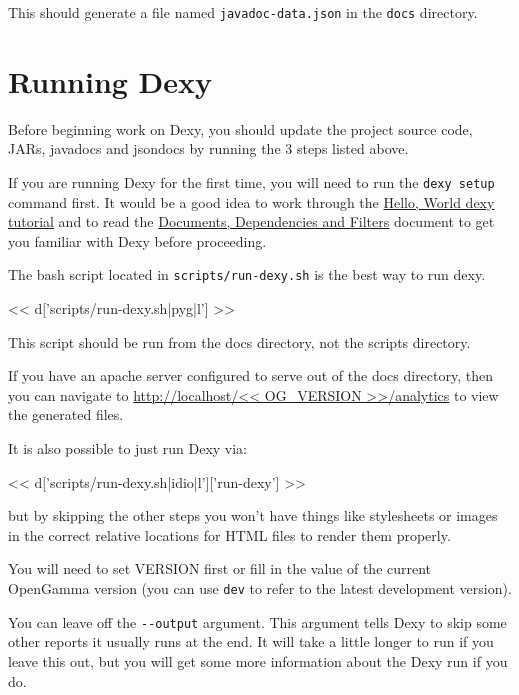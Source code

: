 This should generate a file named \verb|javadoc-data.json| in the
\verb|docs| directory.

\section{Running Dexy}

Before beginning work on Dexy, you should update the project source code, JARs,
javadocs and jsondocs by running the 3 steps listed above.

If you are running Dexy for the first time, you will need to run the \verb|dexy setup|
command first. It would be a good idea to work through the
\href{http://www.dexy.it/docs/tutorials/0-hello-world/}{Hello, World dexy tutorial}
and to read the \href{http://www.dexy.it/docs/guide/documents-dependencies-and-filters/}{Documents, Dependencies and Filters}
document to get you familiar with Dexy before proceeding.

The bash script located in \verb|scripts/run-dexy.sh| is the best way to run dexy.

<< d['scripts/run-dexy.sh|pyg|l'] >>

This script should be run from the docs directory, not the scripts directory.

If you have an apache server configured to serve out of the
docs directory, then you can navigate to
\url{http://localhost/<< OG_VERSION >>/analytics} to view
the generated files.

It is also possible to just run Dexy via:

<< d['scripts/run-dexy.sh|idio|l']['run-dexy'] >>

but by skipping the other steps you won't have things like stylesheets or
images in the correct relative locations for HTML files to render them
properly.

You will need to set VERSION first or fill in the value of the current
OpenGamma version (you can use \verb|dev| to refer to the latest development
version).

You can leave off the \verb|--output| argument. This argument tells Dexy to
skip some other reports it usually runs at the end. It will take a little
longer to run if you leave this out, but you will get some more information
about the Dexy run if you do.
